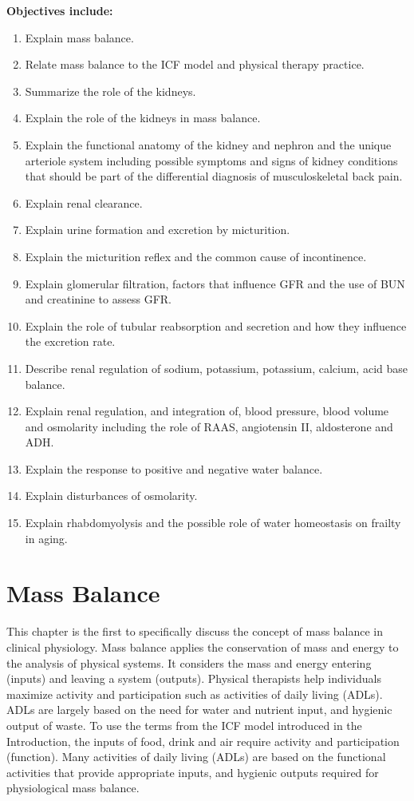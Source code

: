 \textbf{Objectives include:}
\begin{enumerate}
    \item Explain mass balance.
    \item Relate mass balance to the ICF model and physical therapy practice. 
    \item Summarize the role of the kidneys.
    \item Explain the role of the kidneys in mass balance.
    \item Explain the functional anatomy of the kidney and nephron and the unique arteriole system including possible symptoms and signs of kidney conditions that should be part of the differential diagnosis of musculoskeletal back pain.
    \item Explain renal clearance.
    \item Explain urine formation and excretion by micturition.
    \item Explain the micturition reflex and the common cause of incontinence.
    \item Explain glomerular filtration, factors that influence GFR and the use of BUN and creatinine to assess GFR.
    \item Explain the role of tubular reabsorption and secretion and how they influence the excretion rate.
    \item Describe renal regulation of sodium, potassium, potassium, calcium, acid base balance.
    \item Explain renal regulation, and integration of, blood pressure, blood volume and osmolarity including the role of RAAS, angiotensin II, aldosterone and ADH.
    \item Explain the response to positive and negative water balance.
    \item Explain disturbances of osmolarity.
    \item Explain rhabdomyolysis and the possible role of water homeostasis on frailty in aging.
\end{enumerate}

\section{Mass Balance}

This chapter is the first to specifically discuss the concept of mass balance in clinical physiology. Mass balance applies the conservation of mass and energy to the analysis of physical systems. It considers the mass and energy entering (inputs) and leaving a system (outputs). Physical therapists help individuals maximize activity and participation such as activities of daily living (ADLs). ADLs are largely based on the need for water and nutrient input, and hygienic output of waste. To use the terms from the ICF model introduced in the Introduction, the inputs of food, drink and air require activity and participation (function). Many activities of daily living (ADLs) are based on the functional activities that provide appropriate inputs, and hygienic outputs required for physiological mass balance.

